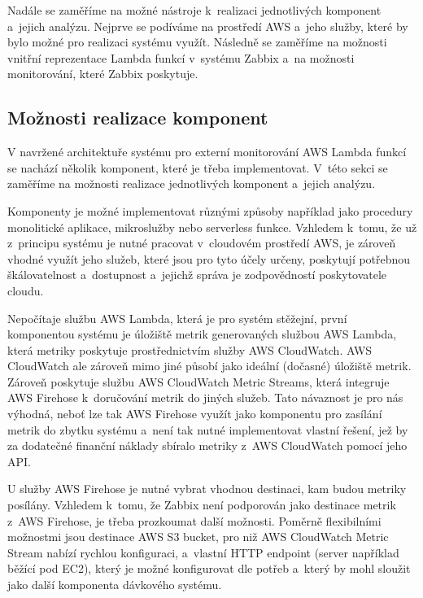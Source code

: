 \documentclass[czech, ing, kiv, he, iso690]{fasthesis}
\begin{document}
Nadále se zaměříme na možné nástroje k~realizaci jednotlivých komponent a~jejich analýzu. Nejprve se podíváme na prostředí AWS a~jeho služby, které by bylo možné pro realizaci systému využít. Následně se zaměříme na možnosti vnitřní reprezentace Lambda funkcí v~systému Zabbix a~na možnosti monitorování, které Zabbix poskytuje.

\subsection{Možnosti realizace komponent}
V navržené architektuře systému pro externí monitorování AWS Lambda funkcí se nachází několik komponent, které je třeba implementovat. V~této sekci se zaměříme na možnosti realizace jednotlivých komponent a~jejich analýzu.

Komponenty je možné implementovat různými způsoby například jako procedury monolitické aplikace, mikroslužby nebo serverless funkce. Vzhledem k~tomu, že už z~principu systému je nutné pracovat v~cloudovém prostředí AWS, je zároveň vhodné využít jeho služeb, které jsou pro tyto účely určeny, poskytují potřebnou škálovatelnost a~dostupnost a~jejichž správa je zodpovědností poskytovatele cloudu.

Nepočítaje službu AWS Lambda, která je pro systém stěžejní, první komponentou systému je úložiště metrik generovaných službou AWS Lambda, která metriky poskytuje prostřednictvím služby AWS CloudWatch. AWS CloudWatch ale zároveň mimo jiné působí jako ideální (dočasné) úložiště metrik. Zároveň poskytuje službu AWS CloudWatch Metric Streams, která integruje AWS Firehose k~doručování metrik do jiných služeb. Tato návaznost je pro nás výhodná, neboť lze tak AWS Firehose využít jako komponentu pro zasílání metrik do zbytku systému a~není tak nutné implementovat vlastní řešení, jež by za dodatečné finanční náklady sbíralo metriky z~AWS CloudWatch pomocí jeho API.

U služby AWS Firehose je nutné vybrat vhodnou destinaci, kam budou metriky posílány. Vzhledem k~tomu, že Zabbix není podporován jako destinace metrik z~AWS Firehose, je třeba prozkoumat další možnosti. Poměrně flexibilními možnostmi jsou destinace AWS S3 bucket, pro niž AWS CloudWatch Metric Stream nabízí rychlou konfiguraci, a~vlastní HTTP endpoint (server například běžící pod EC2), který je možné konfigurovat dle potřeb \cite{firehose.docs.aws} a~který by mohl sloužit jako další komponenta dávkového systému.
\end{document}
